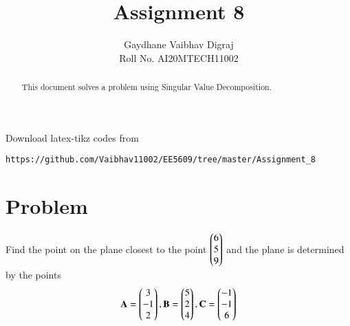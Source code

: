 \documentclass[journal,12pt,twocolumn]{IEEEtran}
\begin{document}
     \def\rightbox#1{\makebox[0in][r]{#1}}
     \def\centbox#1{\makebox[0in]{#1}}
     \def\topbox#1{\raisebox{-\baselineskip}[0in][0in]{#1}}
     \def\midbox#1{\raisebox{-0.5\baselineskip}[0in][0in]{#1}}
\vspace{3cm}
\title{Assignment 8}
\author{Gaydhane Vaibhav Digraj \\ Roll No. AI20MTECH11002}
\maketitle
\newpage
\bigskip
\renewcommand{\thefigure}{\theenumi}
\renewcommand{\thetable}{\theenumi}
\begin{abstract}
This document solves a problem using Singular Value Decomposition. 
\end{abstract}
%
Download latex-tikz codes from 
%
\begin{lstlisting}
https://github.com/Vaibhav11002/EE5609/tree/master/Assignment_8
\end{lstlisting}
%
\section{Problem}
Find the point on the plane closest to the point $\begin{pmatrix}6\\5\\9\end{pmatrix}$ and the plane is determined by the points 
\begin{align*}
    \mathbf{A}=\begin{pmatrix}3\\-1\\2\end{pmatrix}, \mathbf{B}=\begin{pmatrix}5\\2\\4\end{pmatrix}, \mathbf{C}=\begin{pmatrix}-1\\-1\\6\end{pmatrix}
\end{align*}
\end{document}
